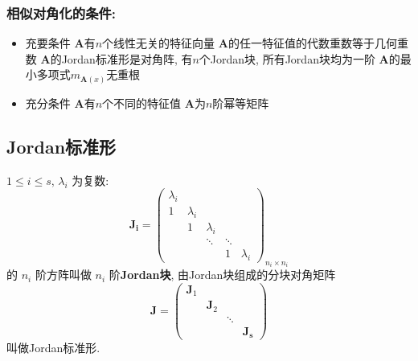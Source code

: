 \documentclass{article}
\begin{document}
				\subsubsection*{相似对角化的条件:}
				\begin{itemize}
					\item 充要条件
						\subitem $\boldsymbol A$有$n$个线性无关的特征向量
						\subitem $\boldsymbol A$的任一特征值的代数重数等于几何重数
						\subitem $\boldsymbol A$的Jordan标准形是对角阵, 有$n$个Jordan块, 所有Jordan块均为一阶
						\subitem $\boldsymbol A$的最小多项式$m_{\boldsymbol{A}(x)}$无重根
					\item 充分条件
						\subitem $\boldsymbol A$有$n$个不同的特征值
						\subitem $\boldsymbol A$为$n$阶幂等矩阵
				\end{itemize}
		\subsection{Jordan标准形}
			$1 \leqslant i \leqslant s$, $\lambda_{i}$ 为复数:
			$$
			\boldsymbol{J_{i}}=\left(\begin{array}{ccccc}
				\lambda_{i} & & & & \\
				1 & \lambda_{i} & & & \\
				& 1 & \lambda_{i} & & \\
				& & \ddots & \ddots & \\
				& & & 1 & \lambda_{i}
			\end{array}\right)_{n_{i} \times n_{i}}
			$$
			的 $n_{i}$ 阶方阵叫做 $n_{i}$ 阶\textbf{Jordan块}, 由Jordan块组成的分块对角矩阵
			$$
			\boldsymbol J=\left(\begin{array}{lllll}
				\boldsymbol J_1 & & & \\
				& \boldsymbol J_2 & & \\
				& & \ddots & \\
				& & & \boldsymbol{J_s}
			\end{array}\right)
			$$
			叫做Jordan标准形.
\end{document}
